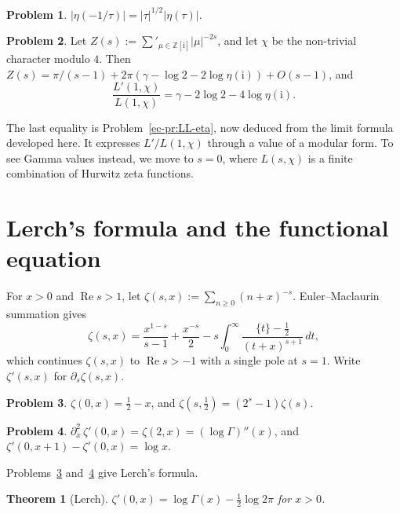 \documentclass[reqno]{amsart}
\theoremstyle{definition}
\newtheorem{problem}{Problem}[section]
\theoremstyle{plain}
\newtheorem{theorem}{Theorem}[section]
\newcommand{\Z}{\mathbb{Z}}
\newcommand{\ii}{\mathrm{i}}
\begin{document}
\begin{problem}\label{pr:eta-mod}
\(\lvert\eta(-1/\tau)\rvert = \lvert\tau\rvert^{1/2} \lvert\eta(\tau)\rvert\).
\end{problem}

\begin{problem}\label{pr:Zi}
Let \(Z(s) := \sum'_{\mu \in \Z[\ii]} \lvert\mu\rvert^{-2s}\), and let \(\chi\) be the non-trivial character modulo \(4\).  Then \(Z(s) = \pi/(s-1) + 2\pi(\gamma - \log 2 - 2\log\eta(\ii)) + O(s-1)\), and
\[
  \frac{L'(1, \chi)}{L(1, \chi)} = \gamma - 2\log 2 - 4\log\eta(\ii) .
\]
\end{problem}

The last equality is Problem~\ref{ec-pr:LL-eta}, now deduced from the limit formula developed here.  It expresses \(L'/L(1,\chi)\) through a value of a modular form.  To see Gamma values instead, we move to \(s = 0\), where \(L(s,\chi)\) is a finite combination of Hurwitz zeta functions.

\section{Lerch's formula and the functional equation}\label{sec:lerch}

For \(x > 0\) and \(\operatorname{Re} s > 1\), let \(\zeta(s, x) := \sum_{n \ge 0} (n + x)^{-s}\).  Euler--Maclaurin summation gives
\[
  \zeta(s, x) = \frac{x^{1-s}}{s - 1} + \frac{x^{-s}}{2} - s \int_0^\infty \frac{\{t\} - \frac12}{(t + x)^{s+1}} \, d t ,
\]
which continues \(\zeta(s, x)\) to \(\operatorname{Re} s > -1\) with a single pole at \(s = 1\).  Write \(\zeta'(s, x)\) for \(\partial_s \zeta(s, x)\).

\begin{problem}\label{pr:hz0}
\(\zeta(0, x) = \frac12 - x\), and \(\zeta(s, \frac12) = (2^s - 1)\zeta(s)\).
\end{problem}

\begin{problem}\label{pr:lerch-diff}
\(\partial_x^2\, \zeta'(0, x) = \zeta(2, x) = (\log\Gamma)''(x)\), and \(\zeta'(0, x+1) - \zeta'(0, x) = \log x\).
\end{problem}

Problems~\ref{pr:hz0} and~\ref{pr:lerch-diff} give Lerch's formula.

\begin{theorem}[Lerch]\label{thm:lerch}
\(\zeta'(0, x) = \log\Gamma(x) - \frac12\log 2\pi\) for \(x > 0\).
\end{theorem}
\end{document}
